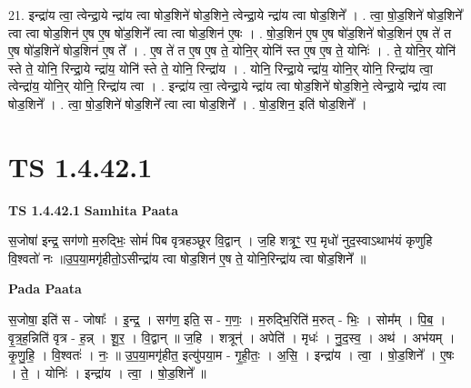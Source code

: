 \documentclass[17pt]{extarticle}
\begin{document}
21. इन्द्रा॑य त्वा॒ त्वेन्द्रा॒ये न्द्रा॑य त्वा षोड॒शिने॑ षोड॒शिने॒ त्वेन्द्रा॒ये न्द्रा॑य त्वा षोड॒शिने᳚ । . त्वा॒ षो॒ड॒शिने॑ षोड॒शिने᳚ त्वा त्वा षोड॒शिन॑ ए॒ष ए॒ष षो॑ड॒शिने᳚ त्वा त्वा षोड॒शिन॑ ए॒षः । . षो॒ड॒शिन॑ ए॒ष ए॒ष षो॑ड॒शिने॑ षोड॒शिन॑ ए॒ष ते॑ त ए॒ष षो॑ड॒शिने॑ षोड॒शिन॑ ए॒ष ते᳚ । . ए॒ष ते॑ त ए॒ष ए॒ष ते॒ योनि॒र् योनि॑ स्त ए॒ष ए॒ष ते॒ योनिः॑ । . ते॒ योनि॒र् योनि॑ स्ते ते॒ योनि॒ रिन्द्रा॒ये न्द्रा॑य॒ योनि॑ स्ते ते॒ योनि॒ रिन्द्रा॑य । . योनि॒ रिन्द्रा॒ये न्द्रा॑य॒ योनि॒र् योनि॒ रिन्द्रा॑य त्वा॒ त्वेन्द्रा॑य॒ योनि॒र् योनि॒ रिन्द्रा॑य त्वा । . इन्द्रा॑य त्वा॒ त्वेन्द्रा॒ये न्द्रा॑य त्वा षोड॒शिने॑ षोड॒शिने॒ त्वेन्द्रा॒ये न्द्रा॑य त्वा षोड॒शिने᳚ । . त्वा॒ षो॒ड॒शिने॑ षोड॒शिने᳚ त्वा त्वा षोड॒शिने᳚ । . षो॒ड॒शिन॒ इति॑ षोड॒शिने᳚ । \newline
\pagebreak
{}

\section{ TS 1.4.42.1 }

\textbf{TS 1.4.42.1 } \newline
\textbf{Samhita Paata} \newline

स॒जोषा॑ इन्द्र॒ सग॑णो म॒रुद्भिः॒ सोमं॑ पिब वृत्रहञ्छूर वि॒द्वान् । ज॒हि शत्रूꣳ॒॒ रप॒ मृधो॑ नुद॒स्वाऽथाभ॑यं कृणुहि वि॒श्वतो॑ नः ॥उ॒प॒या॒मगृ॑हीतो॒ऽसीन्द्रा॑य त्वा षोड॒शिन॑ ए॒ष ते॒ योनि॒रिन्द्रा॑य त्वा षोड॒शिने᳚ ॥ \newline

\textbf{Pada Paata} \newline

स॒जोषा॒ इति॑ स - जोषाः᳚ । इ॒न्द्र॒ । सग॑ण॒ इति॒ स - ग॒णः॒ । म॒रुद्भि॒रिति॑ म॒रुत् - भिः॒ । सोम᳚म् । पि॒ब॒ । वृ॒त्र॒ह॒न्निति॑ वृत्र - ह॒न्न् । शू॒र॒ । वि॒द्वान् ॥ ज॒हि । शत्रून्॑ । अपेति॑ । मृधः॑ । नु॒द॒स्व॒ । अथ॑ । अभ॑यम् । कृ॒णु॒हि॒ । वि॒श्वतः॑ । नः॒ ॥ उ॒प॒या॒मगृ॑हीत॒ इत्यु॑पया॒म - गृ॒ही॒तः॒ । अ॒सि॒ । इन्द्रा॑य । त्वा॒ । षो॒ड॒शिने᳚ । ए॒षः । ते॒ । योनिः॑ । इन्द्रा॑य । त्वा॒ । षो॒ड॒शिने᳚ ॥  \newline
\end{document}
